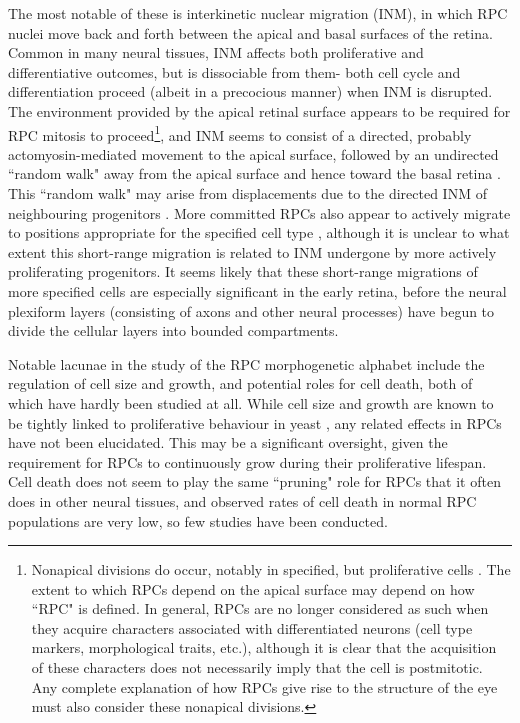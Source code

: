 The most notable of these is interkinetic nuclear migration (INM), in which RPC nuclei move back and forth between the apical and basal surfaces of the retina. Common in many neural tissues, INM affects both proliferative and differentiative outcomes, but is dissociable from them- both cell cycle and differentiation proceed (albeit in a precocious manner) when INM is disrupted\cite{Murciano2002}. The environment provided by the apical retinal surface appears to be required for RPC mitosis to proceed\footnote{Nonapical divisions do occur, notably in specified, but proliferative cells \cite{Godinho2007}. The extent to which RPCs depend on the apical surface may depend on how ``RPC" is defined. In general, RPCs are no longer considered as such when they acquire characters associated with differentiated neurons (cell type markers, morphological traits, etc.), although it is clear that the acquisition of these characters does not necessarily imply that the cell is postmitotic. Any complete explanation of how RPCs give rise to the structure of the eye must also consider these nonapical divisions.}, and INM seems to consist of a directed, probably actomyosin-mediated movement to the apical surface, followed by an undirected ``random walk" away from the apical surface and hence toward the basal retina \cite{Norden2009}. This ``random walk" may arise from displacements due to the directed INM of neighbouring progenitors \cite{Azizi2020}. More committed RPCs also appear to actively migrate to positions appropriate for the specified cell type \cite{Chow2015,Icha2016}, although it is unclear to what extent this short-range migration is related to INM undergone by more actively proliferating progenitors. It seems likely that these short-range migrations of more specified cells are especially significant in the early retina, before the neural plexiform layers (consisting of axons and other neural processes) have begun to divide the cellular layers into bounded compartments.

Notable lacunae in the study of the RPC morphogenetic alphabet include the regulation of cell size and growth, and potential roles for cell death, both of which have hardly been studied at all. While cell size and growth are known to be tightly linked to proliferative behaviour in yeast \cite{Yang2011}, any related effects in RPCs have not been elucidated. This may be a significant oversight, given the requirement for RPCs to continuously grow during their proliferative lifespan. Cell death does not seem to play the same ``pruning" role for RPCs that it often does in other neural tissues, and observed rates of cell death in normal RPC populations are very low, so few studies have been conducted.

